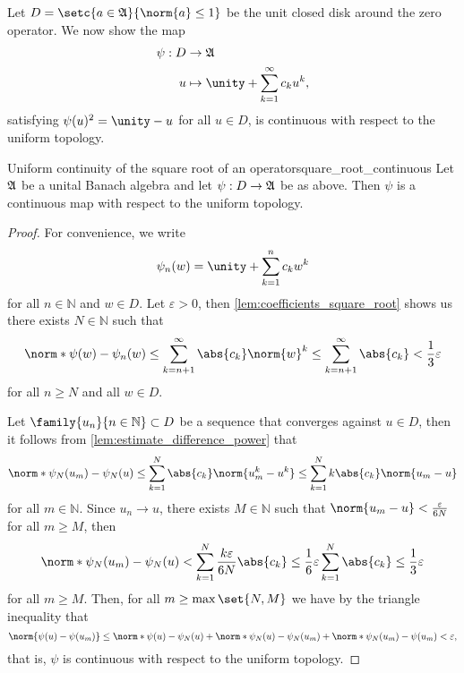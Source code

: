 Let \(D = \setc{a \in \algebra{A}}{\norm{a} \leq 1}\) be the unit closed disk around the zero operator. We now show the map
\begin{align*}
    \psi:D&\to \algebra{A}\\
        u &\mapsto \unity + \sum_{k = 1}^\infty c_k u^k,
\end{align*}
satisfying \(\psi(u)^2 = \unity - u\) for all \(u \in D\), is continuous with respect to the uniform topology.
\begin{proposition}{Uniform continuity of the square root of an operator}{square_root_continuous}
    Let \(\mathfrak{A}\) be a unital Banach algebra and let \(\psi : D \to \mathfrak{A}\) be as above. Then \(\psi\) is a continuous map with respect to the uniform topology.
\end{proposition}
\begin{proof}
    For convenience, we write
    \begin{equation*}
        \psi_n(w) = \unity + \sum_{k = 1}^n c_k w^k
    \end{equation*}
    for all \(n \in \mathbb{N}\) and \(w \in D\). Let \(\varepsilon > 0\), then \cref{lem:coefficients_square_root} shows us there exists \(N \in \mathbb{N}\) such that
    \begin{equation*}
        \norm*{\psi(w) - \psi_n(w)} \leq \sum_{k = n + 1}^\infty \abs{c_k} \norm{w}^k \leq \sum_{k = n + 1}^\infty \abs{c_k} < \frac13\varepsilon
    \end{equation*}
    for all \(n \geq N\) and all \(w \in D\).

    Let \(\family{u_n}{n\in \mathbb{N}} \subset D\) be a sequence that converges against \(u \in D\), then it follows from \cref{lem:estimate_difference_power} that
    \begin{equation*}
        \norm*{\psi_N(u_m) - \psi_N(u)} \leq \sum_{k = 1}^N \abs{c_k} \norm{u_m^k-u^k} \leq \sum_{k = 1}^N k\abs{c_k}\norm{u_m - u}
    \end{equation*}
    for all \(m \in \mathbb{N}\). Since \(u_n \to u\), there exists \(M \in \mathbb{N}\) such that \(\norm{u_m - u} < \frac{\varepsilon}{6N}\) for all \(m \geq M\), then
    \begin{equation*}
        \norm*{\psi_N(u_m) - \psi_N(u)} < \sum_{k = 1}^N \frac{k \varepsilon}{6N} \abs{c_k} \leq \frac16 \varepsilon\sum_{k = 1}^N \abs{c_k} \leq \frac13\varepsilon
    \end{equation*}
    for all \(m \geq M\). Then, for all \(m \geq \max\set{N, M}\) we have by the triangle inequality that
    \begin{equation*}
        \norm{\psi(u) - \psi(u_m)} \leq \norm*{\psi(u) - \psi_N(u)} + \norm*{\psi_N(u) - \psi_N(u_m)} + \norm*{\psi_N(u_m) - \psi(u_m)} < \varepsilon,
    \end{equation*}
    that is, \(\psi\) is continuous with respect to the uniform topology.
\end{proof}

